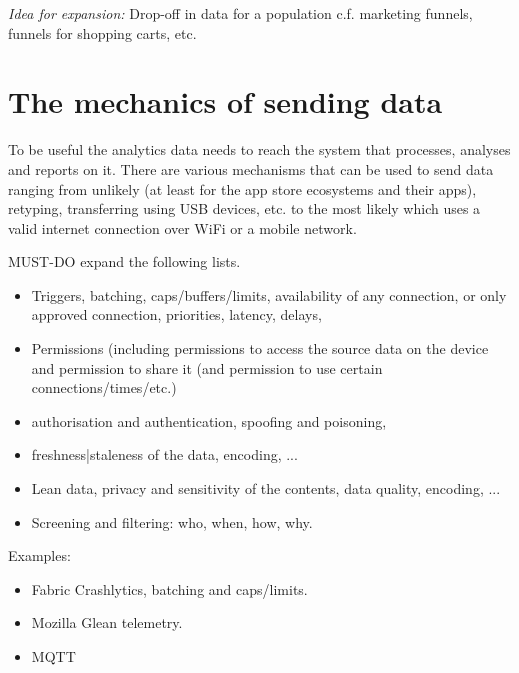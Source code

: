 \emph{Idea for expansion:} Drop-off in data for a population  c.f. marketing funnels, funnels for shopping carts, etc.


\section{The mechanics of sending data}
To be useful the analytics data needs to reach the system that processes, analyses and reports on it. There are various mechanisms that can be used to send data ranging from unlikely (at least for the app store ecosystems and their apps), retyping, transferring using USB devices, etc. to the most likely which uses a valid internet connection over WiFi or a mobile network. 

MUST-DO expand the following lists.
\begin{itemize}
    \item Triggers, batching, caps/buffers/limits, availability of any connection, or only approved connection, priorities, latency, delays,
    \item Permissions (including permissions to access the source data on the device and permission to share it (and permission to use certain connections/times/etc.)
    \item authorisation and authentication, spoofing and poisoning,
    \item freshness|staleness of the data, encoding, ...
    \item Lean data, privacy and sensitivity of the contents, data quality, encoding, ...
    \item Screening and filtering: who, when, how, why.
\end{itemize}

Examples:
\begin{itemize}
    \item Fabric Crashlytics, batching and caps/limits.
    \item Mozilla Glean telemetry.
    \item MQTT~\citep{adil2020_sending_logs_from_flutter_apps}

    
\end{itemize}

